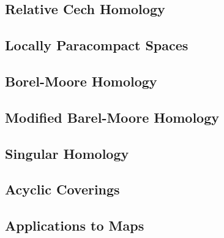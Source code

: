 \subsection{Relative Cech Homology}
\subsection{Locally Paracompact Spaces}
\subsection{Borel-Moore Homology}
\subsection{Modified Barel-Moore Homology}
\subsection{Singular Homology}
\subsection{Acyclic Coverings}
\subsection{Applications to Maps}
